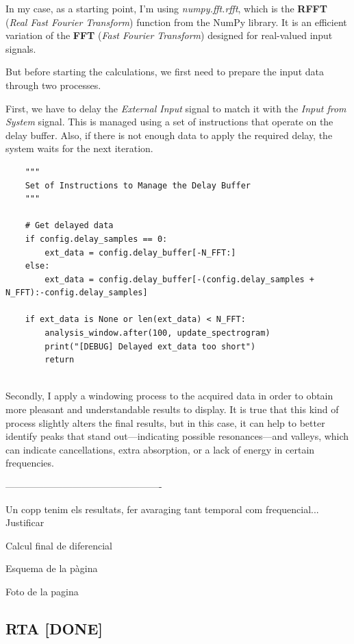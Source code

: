 In my case, as a starting point, I’m using \textit{numpy.fft.rfft}, which is the \textbf{RFFT} (\textit{Real Fast Fourier Transform}) function from the NumPy library. It is an efficient variation of the \textbf{FFT} (\textit{Fast Fourier Transform}) designed for real-valued input signals.

But before starting the calculations, we first need to prepare the input data through two processes.

First, we have to delay the \textit{External Input} signal to match it with the \textit{Input from System} signal. This is managed using a set of instructions that operate on the delay buffer. Also, if there is not enough data to apply the required delay, the system waits for the next iteration.

\begin{verbatim}
	"""
	Set of Instructions to Manage the Delay Buffer
	"""
	
    # Get delayed data
	if config.delay_samples == 0:
		ext_data = config.delay_buffer[-N_FFT:]
	else:
		ext_data = config.delay_buffer[-(config.delay_samples + N_FFT):-config.delay_samples]

	if ext_data is None or len(ext_data) < N_FFT:
		analysis_window.after(100, update_spectrogram)
		print("[DEBUG] Delayed ext_data too short")
		return
	
\end{verbatim}

Secondly, I apply a windowing process to the acquired data in order to obtain more pleasant and understandable results to display. It is true that this kind of process slightly alters the final results, but in this case, it can help to better identify peaks that stand out—indicating possible resonances—and valleys, which can indicate cancellations, extra absorption, or a lack of energy in certain frequencies.

-------------------------------------------------

Un copp tenim els resultats, fer avaraging tant temporal com frequencial... Justificar

Calcul final de diferencial

Esquema de la pàgina

Foto de la pagina





\subsection{RTA [DONE]}

